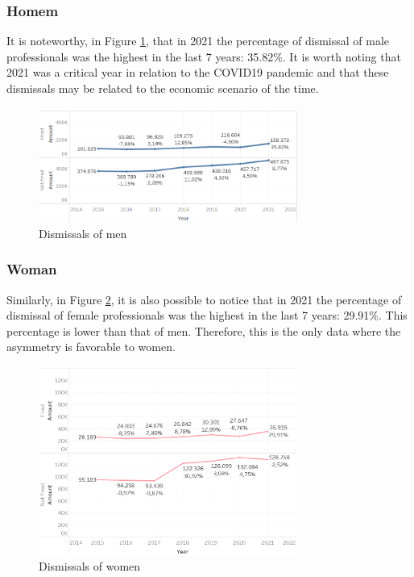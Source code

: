 \subsubsection{Homem}

It is noteworthy, in Figure \ref{fig_4_qnt_h_demit}, that in 2021 the percentage of dismissal of male professionals was the highest in the last 7 years: 35.82\%. It is worth noting that 2021 was a critical year in relation to the COVID19 pandemic and that these dismissals may be related to the economic scenario of the time.

\begin{figure}[htbp]
	\centerline{
		\includegraphics[width=85mm]{assets/4_qnt_h_demit.PNG}
	}
	\caption{Dismissals of men}
	\label{fig_4_qnt_h_demit}
\end{figure}

\subsubsection{Woman}

Similarly, in Figure \ref{fig_4_qnt_m_demit}, it is also possible to notice that in 2021 the percentage of dismissal of female professionals was the highest in the last 7 years: 29.91\%. This percentage is lower than that of men. Therefore, this is the only data where the asymmetry is favorable to women.

\begin{figure}[htbp]
	\centerline{
		\includegraphics[width=85mm]{assets/4_qnt_m_demit.PNG}
	}
	\caption{Dismissals of women}
	\label{fig_4_qnt_m_demit}
\end{figure}

